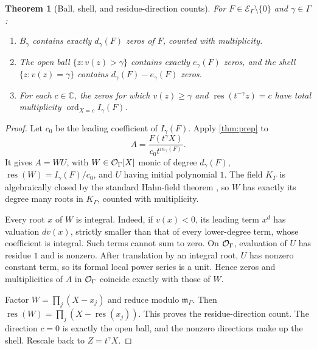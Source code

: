 \documentclass[11pt]{article}
\newtheorem{theorem}{Theorem}[section]
\theoremstyle{plain}
\theoremstyle{plain}
\theoremstyle{plain}
\theoremstyle{definition}
\theoremstyle{definition}
\theoremstyle{definition}
\theoremstyle{remark}
\newcommand{\C}{\mathbb C}\newcommand{\R}{\mathbb R}
\newcommand{\K}{K_\Gamma}\newcommand{\E}{\mathcal E_\Gamma}
\newcommand{\mm}{\mathfrak m_\Gamma}
\DeclareMathOperator{\ord}{ord}\DeclareMathOperator{\cf}{cf}
\newcommand{\res}{\operatorname{res}}
\begin{document}
\begin{theorem}[Ball, shell, and residue-direction counts]\label{thm:roots}
For $F\in\E\setminus\{0\}$ and $\gamma\in\Gamma$:
\begin{enumerate}[label=\textnormal{(\alph*)},leftmargin=2em]
\item $B_\gamma$ contains exactly $d_\gamma(F)$ zeros of $F$, counted
with multiplicity.
\item The open ball $\{z:v(z)>\gamma\}$ contains exactly
$e_\gamma(F)$ zeros, and the shell $\{z:v(z)=\gamma\}$ contains
$d_\gamma(F)-e_\gamma(F)$ zeros.
\item For each $c\in\C$, the zeros for which
$v(z)\ge\gamma$ and $\res(t^{-\gamma}z)=c$ have total multiplicity
$\ord_{X=c}I_\gamma(F)$.
\end{enumerate}
\end{theorem}
\begin{proof}
Let $c_0$ be the leading coefficient of $I_\gamma(F)$. Apply
\cref{thm:prep} to
\[
 A=\frac{F(t^\gamma X)}{c_0t^{m_\gamma(F)}}.
\]
It gives $A=WU$, with $W\in\mathcal O_\Gamma[X]$ monic of degree $d_\gamma(F)$,
$\res(W)=I_\gamma(F)/c_0$, and $U$ having initial polynomial $1$.
The field $\K$ is algebraically closed by the standard Hahn-field
theorem \cite[Corollary~4]{Poonen}, so $W$ has exactly its degree many
roots in $\K$, counted with multiplicity.

Every root $x$ of $W$ is integral. Indeed, if $v(x)<0$, its leading
term $x^d$ has valuation $dv(x)$, strictly smaller than that of every
lower-degree term, whose coefficient is integral. Such terms cannot
sum to zero. On $\mathcal O_\Gamma$, evaluation of $U$ has residue $1$ and is nonzero.
After translation by an integral root, $U$ has nonzero constant term,
so its formal local power series is a unit. Hence zeros and
multiplicities of $A$ in $\mathcal O_\Gamma$ coincide exactly with those of $W$.

Factor $W=\prod_j(X-x_j)$ and reduce modulo $\mm$. Then
$\res(W)=\prod_j(X-\res(x_j))$. This proves the residue-direction
count. The direction $c=0$ is exactly the open ball, and the nonzero
directions make up the shell. Rescale back to $Z=t^\gamma X$.
\end{proof}
\end{document}
